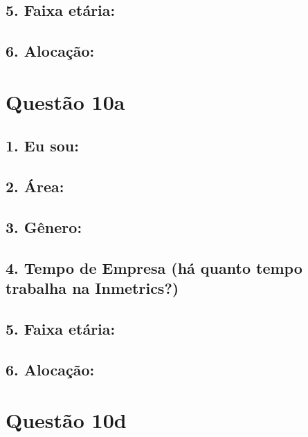 \documentclass[]{book}
\begin{document}
\hypertarget{faixa-etaria-3}{%
\subsection{5. Faixa etária:}\label{faixa-etaria-3}}

\hypertarget{alocacao-3}{%
\subsection{6. Alocação:}\label{alocacao-3}}

\hypertarget{questao-10a}{%
\section{Questão 10a}\label{questao-10a}}

\hypertarget{eu-sou-4}{%
\subsection{1. Eu sou:}\label{eu-sou-4}}

\hypertarget{area-4}{%
\subsection{2. Área:}\label{area-4}}

\hypertarget{genero-4}{%
\subsection{3. Gênero:}\label{genero-4}}

\hypertarget{tempo-de-empresa-ha-quanto-tempo-trabalha-na-inmetrics-4}{%
\subsection{4. Tempo de Empresa (há quanto tempo trabalha na Inmetrics?)}\label{tempo-de-empresa-ha-quanto-tempo-trabalha-na-inmetrics-4}}

\hypertarget{faixa-etaria-4}{%
\subsection{5. Faixa etária:}\label{faixa-etaria-4}}

\hypertarget{alocacao-4}{%
\subsection{6. Alocação:}\label{alocacao-4}}

\hypertarget{questao-10d}{%
\section{Questão 10d}\label{questao-10d}}
\end{document}
